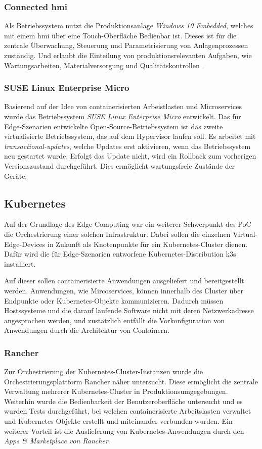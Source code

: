 \subsubsection{Connected \ac{hmi}}
Als Betriebssystem nutzt die Produktionsanlage \textit{Windows 10 Embedded}, welches mit einem \acs{hmi} über eine Touch-Oberfläche Bedienbar ist.
Dieses ist für die zentrale Überwachung, Steuerung und Parametrisierung von Anlagenprozessen zuständig.
Und erlaubt die Einteilung von produktionsrelevanten Aufgaben, wie Wartungsarbeiten, Materialversorgung und Qualitätskontrollen \cite{hmi}.

\subsubsection{SUSE Linux Enterprise Micro}
Basierend auf der Idee von containerisierten Arbeistlasten und Microservices wurde das Betriebssystem \textit{SUSE Linux Enterprise Micro} entwickelt.
Das für Edge-Szenarien entwickelte Open-Source-Betriebssystem ist das zweite virtualisierte Betriebssystem, das auf dem Hypervisor laufen soll.
Es arbeitet mit \textit{transactional-updates}, welche Updates erst aktivieren, wenn das Betriebssystem neu gestartet wurde. 
Erfolgt das Update nicht, wird ein Rollback zum vorherigen Versionszustand durchgeführt. Dies ermöglicht wartungsfreie Zustände der Geräte.



\subsection{Kubernetes}
Auf der Grundlage des Edge-Computing war ein weiterer Schwerpunkt des PoC die Orchestrierung einer solchen Infrastruktur. 
Dabei sollen die einzelnen Virtual-Edge-Devices in Zukunft als Knotenpunkte für ein Kubernetes-Cluster dienen. 
Dafür wird die für Edge-Szenarien entworfene Kubernetes-Distribution k3s installiert.

Auf dieser sollen containerisierte Anwendungen ausgeliefert und bereitgestellt werden.
Anwendungen, wie Mircoservices, können innerhalb des Cluster über Endpunkte oder Kubernetes-Objekte kommunizieren.
Dadurch müssen Hostssysteme und die darauf laufende Software nicht mit deren Netzwerkadresse angesprochen werden,
und zustätzlich entfällt die Vorkonfiguration von Anwendungen durch die Architektur von Containern.


\subsubsection{Rancher}
Zur Orchestrierung der Kubernetes-Cluster-Instanzen wurde die Orchestrierungsplattform Rancher näher untersucht. 
Diese ermöglicht die zentrale Verwaltung mehrerer Kubernetes-Cluster in Produktionsumgegebungen.
Weiterhin wurde die Bedienbarkeit der Benutzeroberfläche untersucht und es wurden Tests durchgeführt, bei welchen
containerisierte Arbeitslasten verwaltet und Kubernetes-Objekte erstellt und miteinander verbunden wurden.
Ein weiterer Vorteil ist die Auslieferung von Kubernetes-Anwendungen durch den \textit{Apps \& Marketplace von Rancher}. 

